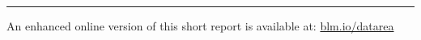 \documentclass[
10pt, %
a4paper, %
oneside, %
headinclude,footinclude, %
BCOR5mm, %
]{scrartcl}
\begin{document}
\vspace{2em}

\hrule

\vspace{1.5em}
\centering 
{\small An enhanced online version of this short
    report is available at:
    \leavevmode\href{http://blm.io/datarea}{blm.io/datarea}}

\end{document}
